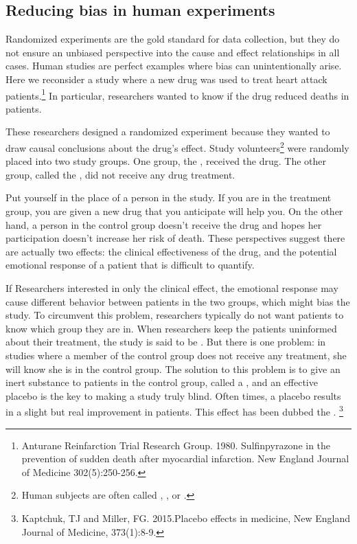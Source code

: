 \begin{doublespace}
\subsection{Reducing bias in human experiments}
\label{biasInHumanExperiments}

Randomized experiments are the gold standard for data collection, but they do not ensure an unbiased perspective into the cause and effect relationships in all cases. Human studies are perfect examples where bias can unintentionally arise. Here we reconsider a study where a new drug was used to treat heart attack patients.\footnote{Anturane Reinfarction Trial Research Group. 1980. Sulfinpyrazone in the prevention of sudden death after myocardial infarction. New England Journal of Medicine 302(5):250-256.} In particular, researchers wanted to know if the drug reduced deaths in patients.

These researchers designed a randomized experiment because they wanted to draw causal conclusions about the drug's effect. Study volunteers\footnote{Human subjects are often called , , or .} were randomly placed into two study groups. One group, the , received the drug. The other group, called the , did not receive any drug treatment.

Put yourself in the place of a person in the study. If you are in the treatment group, you are given a new drug that you anticipate will help you. On the other hand, a person in the control group doesn't receive the drug and hopes her participation doesn't increase her risk of death. These perspectives suggest there are actually two effects: the clinical effectiveness of the drug, and the potential emotional response of a patient that is difficult to quantify.

If Researchers interested in only the clinical effect, the emotional response may cause different behavior between patients in the two groups, which might bias the study. To circumvent this problem, researchers typically do not want patients to know which group they are in. When researchers keep the patients uninformed about their treatment, the study is said to be . But there is one problem: in studies where a member of the control group does not receive any treatment,  she will know she is in the control group. The solution to this problem is to give an inert substance to patients in the control group, called a , and an effective placebo is the key to making a study truly blind. Often times, a placebo results in a slight but real improvement in patients. This effect has been dubbed the . \footnote{Kaptchuk, TJ and Miller, FG. 2015.Placebo effects in medicine, New England Journal of Medicine, 373(1):8-9.}


\end{doublespace}
